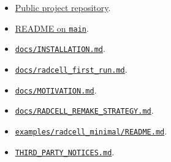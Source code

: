 \documentclass[11pt,a4paper,twoside,pdftex]{refrep}
\begin{document}
\begin{itemize}
  \item \href{https://github.com/luis-gustta/geant4-native-radcell}{Public project repository}.
  \item \href{https://raw.githubusercontent.com/luis-gustta/geant4-native-radcell/main/README.md}{README on \texttt{main}}.
  \item \href{https://raw.githubusercontent.com/luis-gustta/geant4-native-radcell/main/docs/INSTALLATION.md}{\texttt{docs/INSTALLATION.md}}.
  \item \href{https://raw.githubusercontent.com/luis-gustta/geant4-native-radcell/main/docs/radcell_first_run.md}{\texttt{docs/radcell\_first\_run.md}}.
  \item \href{https://raw.githubusercontent.com/luis-gustta/geant4-native-radcell/main/docs/MOTIVATION.md}{\texttt{docs/MOTIVATION.md}}.
  \item \href{https://raw.githubusercontent.com/luis-gustta/geant4-native-radcell/main/docs/RADCELL_REMAKE_STRATEGY.md}{\texttt{docs/RADCELL\_REMAKE\_STRATEGY.md}}.
  \item \href{https://raw.githubusercontent.com/luis-gustta/geant4-native-radcell/main/examples/radcell_minimal/README.md}{\texttt{examples/radcell\_minimal/README.md}}.
  \item \href{https://raw.githubusercontent.com/luis-gustta/geant4-native-radcell/main/THIRD_PARTY_NOTICES.md}{\texttt{THIRD\_PARTY\_NOTICES.md}}.
\end{itemize}
\end{document}
